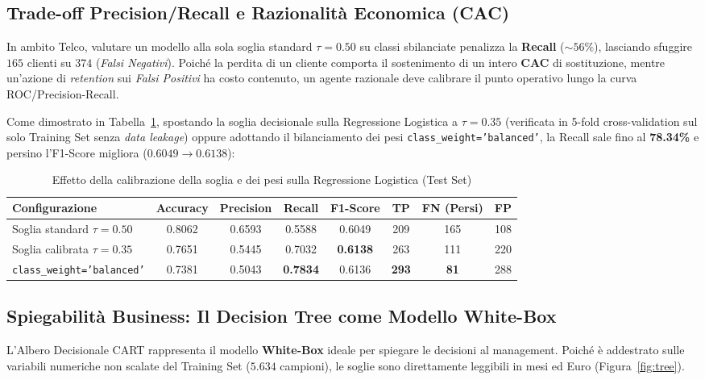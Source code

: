 \documentclass[11pt,a4paper]{article}
\begin{document}
\subsection{Trade-off Precision/Recall e Razionalità Economica (CAC)}
In ambito Telco, valutare un modello alla sola soglia standard $\tau = 0.50$ su classi sbilanciate penalizza la \textbf{Recall} ($\sim 56\%$), lasciando sfuggire $165$ clienti su $374$ (\textit{Falsi Negativi}). Poiché la perdita di un cliente comporta il sostenimento di un intero \textbf{CAC} di sostituzione, mentre un'azione di \textit{retention} sui \textit{Falsi Positivi} ha costo contenuto, un agente razionale deve calibrare il punto operativo lungo la curva ROC/Precision-Recall.

Come dimostrato in Tabella~\ref{tab:threshold}, spostando la soglia decisionale sulla Regressione Logistica a $\tau = 0.35$ (verificata in 5-fold cross-validation sul solo Training Set senza \textit{data leakage}) oppure adottando il bilanciamento dei pesi \texttt{class\_weight='balanced'}, la Recall sale fino al \textbf{78.34\%} e persino l'F1-Score migliora ($0.6049 \rightarrow 0.6138$):

\begin{table}[H]
\centering
\caption{Effetto della calibrazione della soglia e dei pesi sulla Regressione Logistica (Test Set)}
\label{tab:threshold}
\small
\setlength{\tabcolsep}{4.5pt}
\begin{tabular}{lccccccc}
\toprule
\textbf{Configurazione} & \textbf{Accuracy} & \textbf{Precision} & \textbf{Recall} & \textbf{F1-Score} & \textbf{TP} & \textbf{FN (Persi)} & \textbf{FP} \\
\midrule
Soglia standard $\tau = 0.50$ & 0.8062 & 0.6593 & 0.5588 & 0.6049 & 209 & 165 & 108 \\
Soglia calibrata $\tau = 0.35$ & 0.7651 & 0.5445 & 0.7032 & \textbf{0.6138} & 263 & 111 & 220 \\
\texttt{class\_weight='balanced'} & 0.7381 & 0.5043 & \textbf{0.7834} & 0.6136 & \textbf{293} & \textbf{81} & 288 \\
\bottomrule
\end{tabular}
\end{table}

\subsection{Spiegabilità Business: Il Decision Tree come Modello White-Box}
L'Albero Decisionale CART rappresenta il modello \textbf{White-Box} ideale per spiegare le decisioni al management. Poiché è addestrato sulle variabili numeriche non scalate del Training Set ($5.634$ campioni), le soglie sono direttamente leggibili in mesi ed Euro (Figura~\ref{fig:tree}).
\end{document}
